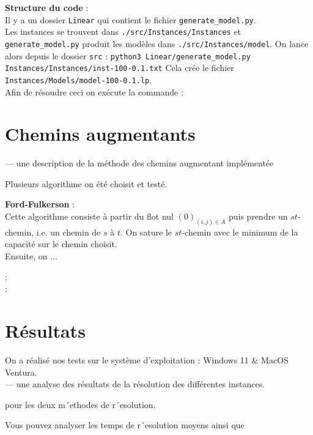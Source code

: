 \documentclass{article}[12pt]
\begin{document}
{\bf Structure du code } : \\
Il y a un dossier \texttt{Linear} qui contient le fichier \texttt{generate\_model.py}. \\
Les instances se trouvent dans \texttt{./src/Instances/Instances} et \texttt{generate\_model.py} produit les modèles dans \texttt{./src/Instances/model}.
On lance alors depuis le dossier \texttt{src} : 
\texttt{python3 Linear/generate\_model.py Instances/Instances/inst-100-0.1.txt}
Cela crée le fichier \texttt{Instances/Models/model-100-0.1.lp}.\\
 Afin de résoudre ceci on exécute la commande : \\


\section{Chemins augmentants}

— une description de la méthode des chemins augmentant implémentée

Plusieurs algorithme on été choisit et testé.

{\bf Ford-Fulkerson} : \\

Cette algorithme consiste à partir du flot nul $(0)_{(i,j) \in A}$ puis prendre un $st$-chemin, i.e. un chemin de $s$ à $t$.
On sature le $st$-chemin avec le minimum de la capacité sur le chemin choisit.\\
Ensuite, on ... %

{\bf } : \\

{\bf } : \\

\section{Résultats}
    
 On a réalisé nos tests sur le système d’exploitation : Windows 11 \& MacOS Ventura.\\

— une analyse des résultats de la résolution des différentes instances.



   pour les deux m´ethodes de r´esolution.

Vous pouvez analyser
   les temps de r´esolution moyens ainsi que
\end{document}
